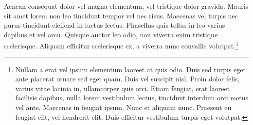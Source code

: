 Aenean consequat dolor vel magna elementum, vel tristique dolor gravida. Mauris sit amet lorem non leo tincidunt tempor vel nec risus. Maecenas vel turpis nec purus tincidunt eleifend in luctus lectus. Phasellus quis tellus in leo varius dapibus et vel arcu. Quisque auctor leo odio, non viverra enim tristique scelerisque. Aliquam efficitur scelerisque ex, a viverra nunc convallis volutpat.\footnote{Nullam a erat vel ipsum elementum laoreet at quis odio. Duis sed turpis eget ante placerat ornare sed eget quam. Duis vel suscipit nisl. Proin dolor felis, varius vitae lacinia in, ullamcorper quis orci. Etiam feugiat, erat laoreet facilisis dapibus, nulla lorem vestibulum lectus, tincidunt interdum orci metus vel ante. Maecenas in feugiat ipsum. Nunc et aliquam nunc. Praesent eu feugiat elit, vel hendrerit elit. Duis efficitur vestibulum turpis eget volutpat.}



